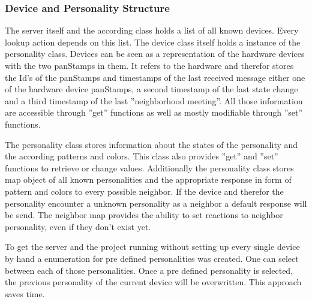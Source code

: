 \subsubsection{Device and Personality Structure}
The server itself and the according class holds a list of all known devices. Every lookup action depends on this list. The device class itself holds a instance of the personality class.
Devices can be seen as a representation of the hardware devices with the two panStamps in them. It refers to the hardware and therefor stores the Id's of the panStamps and timestamps of the last received message either one of the hardware device panStamps, a second timestamp of the last state change and a third timestamp of the last ''neighborhood meeting''. All those information are accessible through ''get'' functions as well as mostly modifiable through ''set'' functions.

The personality class stores information about the states of the personality and the according patterns and colors. This class also provides ''get'' and ''set'' functions to retrieve or change values. Additionally the personality class stores map object of all known personalities and the appropriate response in form of pattern and colors to every possible neighbor. If the device and therefor the personality encounter a unknown personality as a neighbor a default response will be send. 
The neighbor map provides the ability to set reactions to neighbor personality, even if they don't exist yet.

To get the server and the project running without setting up every single device by hand a enumeration for pre defined personalities was created. One can select between each of those personalities. Once a pre defined personality is selected, the previous personality of the current device will be overwritten. This approach saves time.

